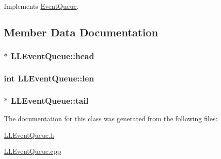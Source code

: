 Implements \hyperlink{class_event_queue_a4f49434cc8ca60030f2b5737399527e2}{Event\+Queue}.



\subsection{Member Data Documentation}
\subsubsection[{\texorpdfstring{head}{head}}]{$\ast$ L\+L\+Event\+Queue\+::head}\hypertarget{class_l_l_event_queue_a9f789093fd1f9af546885d589ccf3271}{}\label{class_l_l_event_queue_a9f789093fd1f9af546885d589ccf3271}
\subsubsection[{\texorpdfstring{len}{len}}]{\setlength{\rightskip}{0pt plus 5cm}int L\+L\+Event\+Queue\+::len}\hypertarget{class_l_l_event_queue_a86b7dfcff49beb1443b57d0610725c3b}{}\label{class_l_l_event_queue_a86b7dfcff49beb1443b57d0610725c3b}
\subsubsection[{\texorpdfstring{tail}{tail}}]{$\ast$ L\+L\+Event\+Queue\+::tail}\hypertarget{class_l_l_event_queue_a1f5ddd89f1a0b4c7e475b364b0084564}{}\label{class_l_l_event_queue_a1f5ddd89f1a0b4c7e475b364b0084564}


The documentation for this class was generated from the following files\+:\begin{DoxyCompactItemize}
\item 
\hyperlink{_l_l_event_queue_8h}{L\+L\+Event\+Queue.\+h}\item 
\hyperlink{_l_l_event_queue_8cpp}{L\+L\+Event\+Queue.\+cpp}\end{DoxyCompactItemize}
